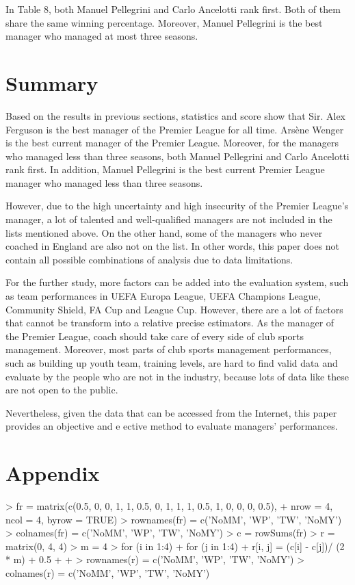 \documentclass[12pt,a4paper]{article}
\begin{document}
    In Table 8, both Manuel Pellegrini and Carlo Ancelotti rank first. Both of them share the same winning percentage. Moreover, Manuel Pellegrini is the best manager who managed at most three seasons.


\section{Summary}

    Based on the results in previous sections, statistics and score show that Sir. Alex Ferguson is the best manager of the Premier League for all time. Arsène Wenger is the best current manager of the Premier League. Moreover, for the managers who managed less than three seasons, both Manuel Pellegrini and Carlo Ancelotti rank first. In addition, Manuel Pellegrini is the best current Premier League manager who managed less than three seasons.
    
    However, due to the high uncertainty and high insecurity of the Premier League's manager, a lot of talented and well-qualified managers are not included in the lists mentioned above. On the other hand, some of the managers who never coached in England are also not on the list. In other words, this paper does not contain all possible combinations of analysis due to data limitations.
    
    For the further study, more factors can be added into the evaluation system, such as team performances in UEFA Europa League, UEFA Champions League, Community Shield, FA Cup and League Cup. However, there are a lot of factors that cannot be transform into a relative precise estimators. As the manager of the Premier League, coach should take care of every side of club sports management. Moreover, most parts of club sports management performances, such as building up youth team, training levels, are hard to find valid data and evaluate by the people who are not in the industry, because lots of data like these are not open to the public.
    
    Nevertheless, given the data that can be accessed from the Internet, this paper provides an objective and e ective method to evaluate managers' performances.
    
    
\newpage
\section{Appendix}

\begin{Schunk}
\begin{Sinput}
> fr = matrix(c(0.5, 0, 0, 1, 1, 0.5, 0, 1, 1, 1, 0.5, 1, 0, 0, 0, 0.5), 
+             nrow = 4, ncol = 4, byrow  = TRUE)
> rownames(fr) = c('NoMM', 'WP', 'TW', 'NoMY')
> colnames(fr) = c('NoMM', 'WP', 'TW', 'NoMY')
> c = rowSums(fr)
> r = matrix(0, 4, 4)
> m = 4 
> for (i in 1:4) {
+     for (j in 1:4) {
+         r[i, j] = (c[i] - c[j])/ (2 * m) + 0.5
+     }
+ }
> rownames(r) = c('NoMM', 'WP', 'TW', 'NoMY')
> colnames(r) = c('NoMM', 'WP', 'TW', 'NoMY')
\end{Sinput}
\end{Schunk}
\end{document}
